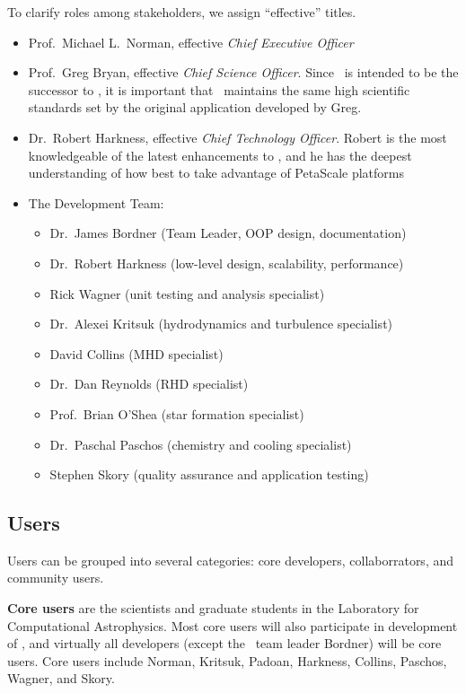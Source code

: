\documentclass[12pt]{article}
\begin{document}
To clarify roles among stakeholders, we assign ``effective'' titles.

\begin{itemize}
%
 \item  Prof.~Michael L.~Norman, effective \textit{Chief Executive Officer}
%
 \item Prof.~Greg Bryan, effective \textit{Chief Science Officer}.
 Since \cello\ is intended to be the successor to \enzo, it is
 important that \cello\ maintains the same high scientific standards
 set by the original application developed by Greg.
%
 \item Dr.~Robert Harkness, effective \textit{Chief Technology
 Officer}.  Robert is the most knowledgeable of the latest enhancements to
 \enzo, and he has the deepest understanding of how best to take advantage of
 PetaScale platforms
%
\item The Development Team:
\begin{itemize}
\item Dr.~James Bordner (Team Leader, OOP design, documentation)
\item Dr.~Robert Harkness (low-level design, scalability, performance)
\item Rick Wagner (unit testing and analysis specialist)
\item Dr.~Alexei Kritsuk (hydrodynamics and turbulence specialist)
\item David Collins (MHD specialist)
\item Dr.~Dan Reynolds (RHD specialist)
\item Prof.~Brian O'Shea (star formation specialist)
\item Dr.~Paschal Paschos (chemistry and cooling specialist)
\item Stephen Skory (quality assurance and application testing)
\end{itemize}
\end{itemize}
    

\subsection{Users}


    Users can be grouped into several categories: core developers,
    collaborrators, and community users.

    \textbf{Core users} are the scientists and graduate students in
    the Laboratory for Computational Astrophysics.  Most core users
    will also participate in development of \cello, and virtually all
    developers (except the \cello\ team leader Bordner) will be core
    users.  Core users include Norman, Kritsuk, Padoan, Harkness,
    Collins, Paschos, Wagner, and Skory.
\end{document}
